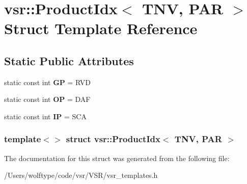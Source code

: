 \hypertarget{structvsr_1_1_product_idx_3_01_t_n_v_00_01_p_a_r_01_4}{\section{vsr\-:\-:Product\-Idx$<$ T\-N\-V, P\-A\-R $>$ Struct Template Reference}
\label{structvsr_1_1_product_idx_3_01_t_n_v_00_01_p_a_r_01_4}
}
\subsection*{Static Public Attributes}
\begin{DoxyCompactItemize}
\item 
\hypertarget{structvsr_1_1_product_idx_3_01_t_n_v_00_01_p_a_r_01_4_a8a445a86cdf41418ec4bfa695419465a}{static const int {\bfseries G\-P} = R\-V\-D}\label{structvsr_1_1_product_idx_3_01_t_n_v_00_01_p_a_r_01_4_a8a445a86cdf41418ec4bfa695419465a}

\item 
\hypertarget{structvsr_1_1_product_idx_3_01_t_n_v_00_01_p_a_r_01_4_aeab4d46d6f1c2cb5bbdc0068c5fb5f48}{static const int {\bfseries O\-P} = D\-A\-F}\label{structvsr_1_1_product_idx_3_01_t_n_v_00_01_p_a_r_01_4_aeab4d46d6f1c2cb5bbdc0068c5fb5f48}

\item 
\hypertarget{structvsr_1_1_product_idx_3_01_t_n_v_00_01_p_a_r_01_4_a0b433508be5f02165f7ec37fb49368d3}{static const int {\bfseries I\-P} = S\-C\-A}\label{structvsr_1_1_product_idx_3_01_t_n_v_00_01_p_a_r_01_4_a0b433508be5f02165f7ec37fb49368d3}

\end{DoxyCompactItemize}
\subsubsection*{template$<$$>$ struct vsr\-::\-Product\-Idx$<$ T\-N\-V, P\-A\-R $>$}



The documentation for this struct was generated from the following file\-:\begin{DoxyCompactItemize}
\item 
/\-Users/wolftype/code/vsr/\-V\-S\-R/vsr\-\_\-templates.\-h\end{DoxyCompactItemize}
